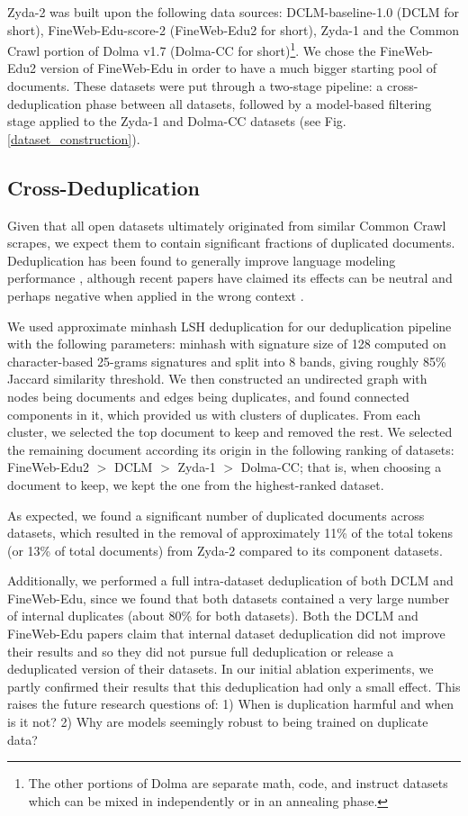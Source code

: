 \documentclass[conference]{IEEEtran}
\begin{document}
Zyda-2 was built upon the following data sources: DCLM-baseline-1.0 (DCLM for short), FineWeb-Edu-score-2 (FineWeb-Edu2 for short), Zyda-1 and the Common Crawl portion of Dolma v1.7 (Dolma-CC for short)\footnote{The other portions of Dolma are separate math, code, and instruct datasets which can be mixed in independently or in an annealing phase.}. We chose the FineWeb-Edu2 version of FineWeb-Edu in order to have a much bigger starting pool of documents. These datasets were put through a two-stage pipeline: a cross-deduplication phase between all datasets, followed by a model-based filtering stage applied to the Zyda-1 and Dolma-CC datasets (see Fig. \ref{dataset_construction}).

\subsection{Cross-Deduplication}

Given that all open datasets ultimately originated from similar Common Crawl scrapes, we expect them to contain significant fractions of duplicated documents. Deduplication has been found to generally improve language modeling performance \citep{lee2021deduplicating}, although recent papers have claimed its effects can be neutral and perhaps negative when applied in the wrong context \citep{li2024dclm}. 

We used approximate minhash LSH deduplication for our deduplication pipeline with the following parameters: minhash with signature size of 128 computed on character-based 25-grams signatures and split into 8 bands, giving roughly 85\% Jaccard similarity threshold. We then constructed an undirected graph with nodes being documents and edges being duplicates, and found connected components in it, which provided us with clusters of duplicates. From each cluster, we selected the top document to keep and removed the rest. We selected the remaining document according its origin in the following ranking of datasets: FineWeb-Edu2 $>$ DCLM $>$ Zyda-1 $>$ Dolma-CC; that is, when choosing a document to keep, we kept the one from the highest-ranked dataset.

As expected, we found a significant number of duplicated documents across datasets, which resulted in the removal of approximately 11\% of the total tokens (or 13\% of total documents) from Zyda-2 compared to its component datasets. 

Additionally, we performed a full intra-dataset deduplication of both DCLM and FineWeb-Edu, since we found that both datasets contained a very large number of internal duplicates (about 80\% for both datasets). Both the DCLM and FineWeb-Edu papers claim that internal dataset deduplication did not improve their results and so they did not pursue full deduplication or release a deduplicated version of their datasets. In our initial ablation experiments, we partly confirmed their results that this deduplication had only a small effect. This raises the future research questions of: 1) When is duplication harmful and when is it not? 2) Why are models seemingly robust to being trained on duplicate data?
\end{document}
